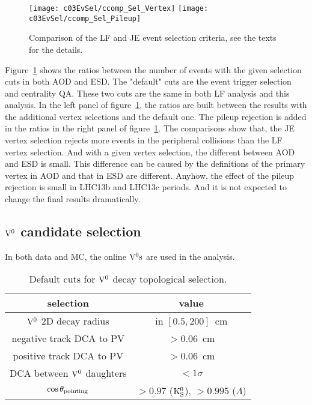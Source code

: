 \begin{figure}[htbp]
\begin{center}
\texttt{[image: c03EvSel/ccomp\_Sel\_Vertex]}
\texttt{[image: c03EvSel/ccomp\_Sel\_Pileup]}
\caption{Comparison of the LF and JE event selection criteria,
         see the texts for the details.}
\label{fig:c03CompEventSel}
\end{center}
\end{figure}

Figure~\ref{fig:c03CompEventSel} shows the ratios between the number of events
with the given selection cuts in both AOD and ESD.
The "default" cuts are the event trigger selection and centrality QA.
These two cuts are the same in both LF analysis and this analysis.
In the left panel of figure~\ref{fig:c03CompEventSel},
the ratios are built between the results with the additional
vertex selections and the default one.
The pileup rejection is added in the ratios in the right panel of
figure~\ref{fig:c03CompEventSel}.
The comparisons show that,
the JE vertex selection rejects more events in the peripheral collisions than
the LF vertex selection.
And with a given vertex selection,
the different between AOD and ESD is small.
This difference can be caused by the definitions of the primary vertex in
AOD and that in ESD are different.
Anyhow, the effect of the pileup rejection is small in
LHC13b and LHC13c periods.
And it is not expected to change the final results dramatically.

\subsection{${\rm V}^{0}$ candidate selection}\label{sec:c03V0CandiSel}

In both data and MC, the online ${\rm V}^{0}{\rm s}$ are used in the analysis.

\begin{table}[htdp]
\begin{center}
\begin{tabular}{|c|c|}
\hline
selection                      & value \\
\hline
${\rm V}^{0}$ 2D decay radius       & in $[0.5,200]$~cm \\
negative track DCA to PV       & $>0.06$~cm \\
positive track DCA to PV       & $>0.06$~cm \\
DCA between ${\rm V}^{0}$ daughters & $<1\sigma$ \\
$\cos\theta_{\rm pointing}$    & $>0.97$ (${\rm K}_{\rm S}^{0}$), $>0.995$ ($\Lambda$) \\
\hline
\end{tabular}
\end{center}
\caption{Default cuts for ${\rm V}^{0}$ decay topological selection.}
\label{tab:c03ValSelV0Topo}
\end{table}

